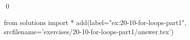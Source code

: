 
\begin{ex}
  \label{ex:20-10-for-loops-part1}
  
  \qed
\end{ex}
\begin{python0}
from solutions import *
add(label="ex:20-10-for-loops-part1",
    srcfilename='exercises/20-10-for-loops-part1/answer.tex')
\end{python0}
